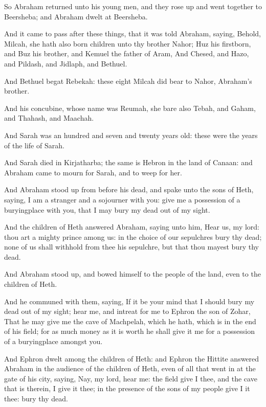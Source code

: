 \Verse So Abraham returned unto his young men, and they rose up and went together to Beersheba; and Abraham dwelt at Beersheba.

\Verse And it came to pass after these things, that it was told Abraham, saying, Behold, Milcah, she hath also born children unto thy brother Nahor; \Verse Huz his firstborn, and Buz his brother, and Kemuel the father of Aram, \Verse And Chesed, and Hazo, and Pildash, and Jidlaph, and Bethuel.

\Verse And Bethuel begat Rebekah: these eight Milcah did bear to Nahor, Abraham's brother.

\Verse And his concubine, whose name was Reumah, she bare also Tebah, and Gaham, and Thahash, and Maachah.

\Chapter
\Verse And Sarah was an hundred and seven and twenty years old: these were the years of the life of Sarah.

\Verse And Sarah died in Kirjatharba; the same is Hebron in the land of Canaan: and Abraham came to mourn for Sarah, and to weep for her.

\Verse And Abraham stood up from before his dead, and spake unto the sons of Heth, saying, \Verse I am a stranger and a sojourner with you: give me a possession of a buryingplace with you, that I may bury my dead out of my sight.

\Verse And the children of Heth answered Abraham, saying unto him, \Verse Hear us, my lord: thou art a mighty prince among us: in the choice of our sepulchres bury thy dead; none of us shall withhold from thee his sepulchre, but that thou mayest bury thy dead.

\Verse And Abraham stood up, and bowed himself to the people of the land, even to the children of Heth.

\Verse And he communed with them, saying, If it be your mind that I should bury my dead out of my sight; hear me, and intreat for me to Ephron the son of Zohar, \Verse That he may give me the cave of Machpelah, which he hath, which is in the end of his field; for as much money as it is worth he shall give it me for a possession of a buryingplace amongst you.

\Verse And Ephron dwelt among the children of Heth: and Ephron the Hittite answered Abraham in the audience of the children of Heth, even of all that went in at the gate of his city, saying, \Verse Nay, my lord, hear me: the field give I thee, and the cave that is therein, I give it thee; in the presence of the sons of my people give I it thee: bury thy dead.

